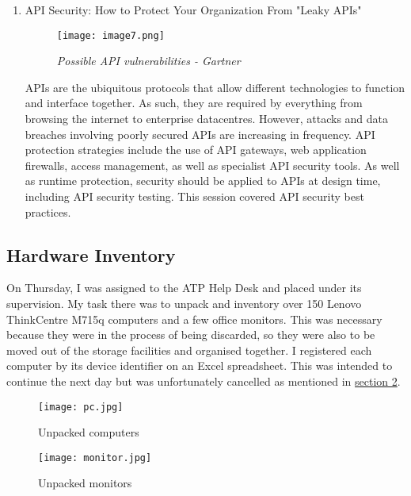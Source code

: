 \begin{enumerate}
    \newpage

    \item \color{dgreen} API Security: How to Protect Your Organization From
          "Leaky APIs"

    \begin{figure}[H]
        \centering
            \texttt{[image: image7.png]}
            \caption*{\textit{Possible API vulnerabilities - Gartner}}
    \end{figure}

    \color{black} APIs are the ubiquitous protocols that allow different
    technologies to function and interface together. As such, they are required
    by everything from browsing the internet to enterprise datacentres. However,
    attacks and data breaches involving poorly secured APIs are increasing in
    frequency. API protection strategies include the use of API gateways, web
    application firewalls, access management, as well as specialist API security
    tools. As well as runtime protection, security should be applied to APIs at
    design time, including API security testing. This session covered API
    security best practices.
\end{enumerate}

\subsection{Hardware Inventory}

On Thursday, I was assigned to the ATP Help Desk and placed under its
supervision. My task there was to unpack and inventory over 150 Lenovo
ThinkCentre M715q computers and a few office monitors. This was necessary
because they were in the process of being discarded, so they were also to be
moved out of the storage facilities and organised together.  I registered each
computer by its device identifier on an Excel spreadsheet.\cite{pc_excel} This
was intended to continue the next day but was unfortunately cancelled as
mentioned in \hyperlink{section.2}{section 2}.

\begin{figure}[H]
    \centering
    \begin{minipage}[b]{0.49\textwidth}
      \texttt{[image: pc.jpg]}
      \caption*{Unpacked computers}
    \end{minipage}
    \hfill
    \begin{minipage}[b]{0.49\textwidth}
      \texttt{[image: monitor.jpg]}
      \caption*{Unpacked monitors}
    \end{minipage}
\end{figure}

